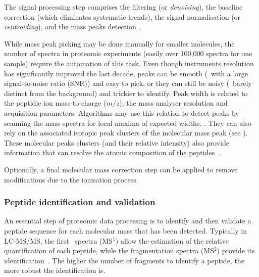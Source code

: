 The signal processing step comprises
the filtering (or \emph{denoising}),
the baseline correction (which eliminates systematic trends),
the signal normalisation (or \emph{centroiding}),
and the mass peaks detection~.

While mass peak picking may be done manually for smaller molecules,
the number of spectra in proteomic experiments
(easily over 100,000 spectra for one sample)
require the automation of this task.
Even though instruments resolution has significantly improved the last decade,
peaks can be smooth (\ie\ with a large signal-to-noise ratio (\gls{SNR}))
and easy to pick, or they can still be noisy
(\ie\ barely distinct from the background) and trickier to identify.
Peak width is related to the peptidic ion mass-to-charge ($m/z$),
the mass analyser resolution and acquisition parameters.
Algorithms may use this relation to detect peaks by
scanning the mass spectra for local maxima of expected widths. .
They can also rely on
the associated isotopic peak clusters of the molecular mass peak
(see ).
These molecular peaks clusters (and their relative intensity) also provide
information that can resolve the atomic composition of the peptides~.

Optionally, a final molecular mass correction step can be applied to remove
modifications due to the ionisation process.


\subsubsection{Peptide identification and validation}\label{subsub:peptideID}

An essential step of proteomic data processing is to identify and then validate
a peptide sequence for each molecular mass that has been detected.
Typically in \gls{LC-MS/MS},
the first \ms\ spectra (MS$^1$) allow the estimation of the relative
quantification of each peptide,
while the fragmentation spectra (MS$^2$) provide its identification~.
The higher the number of fragments to identify a peptide,
the more robust the identification is.

